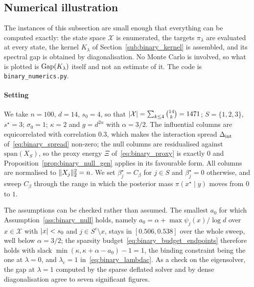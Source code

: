 \documentclass[aos]{imsart}%
\DeclarePairedDelimiter{\norm}{\lVert}{\rVert}
\DeclarePairedDelimiter{\abs}{\lvert}{\rvert}
\newcommand{\ambientspace}[0]{\mathcal{X}}
\theoremstyle{plain}
\theoremstyle{definition}
\begin{document}
    \subsection{Numerical illustration}
    \label{sub:binary_numerics}

    The instances of this subsection are small enough that everything can be
    computed exactly: the state space $\ambientspace$ is enumerated, the
    targets $\pi_\lambda$ are evaluated at every state, the kernel $K_\lambda$
    of Section~\ref{sub:binary_kernel} is assembled, and its spectral gap is
    obtained by diagonalisation. No Monte Carlo is involved, so what is plotted
    is $\mathrm{Gap}(K_\lambda)$ itself and not an estimate of it. The code is
    \texttt{binary\_numerics.py}.

    \paragraph{Setting}
    We take $n=100$, $d=14$, $s_0=4$, so that
    $\abs{\ambientspace}=\sum_{k\leq4}\binom{14}{k}=1471$; $S=\{1,2,3\}$,
    $s^{\star}=3$; $\sigma_0=1$; $\kappa=2$ and $g=d^{2\alpha}$ with
    $\alpha=3/2$. The influential columns are equicorrelated with correlation
    $0.3$, which makes the interaction spread $\Delta_{\mathrm{int}}$
    of~\eqref{eq:binary_spread} non-zero; the null columns are residualised
    against $\mathrm{span}(X_S)$, so the proxy energy $\Xi$
    of~\eqref{eq:binary_proxy} is exactly $0$ and
    Proposition~\ref{prop:binary_null_gen} applies in its favourable form. All
    columns are normalised to $\norm{X_j}_2^{2}=n$. We set
    $\beta^\star_j=C_\beta$ for $j\in S$ and $\beta^\star_j=0$ otherwise, and
    sweep $C_\beta$ through the range in which the posterior mass
    $\pi(x^{\star}\mid y)$ moves from $0$ to $1$.

    The assumptions can be checked rather than assumed. The smallest $a_0$ for
    which Assumption~\ref{ass:binary_null} holds, namely
    $a_0=\alpha+\max\psi_j(x)/\log d$ over $x\in\ambientspace$ with
    $\abs x<s_0$ and $j\in S^{c}\setminus x$, stays in $[0.506,0.538]$ over the
    whole sweep, well below $\alpha=3/2$; the sparsity
    budget~\eqref{eq:binary_budget_endpoints} therefore holds with slack
    $\min(\kappa,\kappa+\alpha-a_0)-1=1$, the binding constraint being the one
    at $\lambda=0$, and $\lambda_c=1$ in~\eqref{eq:binary_lambdac}. As a check
    on the eigensolver, the gap at $\lambda=1$ computed by the sparse
    deflated solver and by dense diagonalisation agree to seven significant
    figures.
\end{document}
